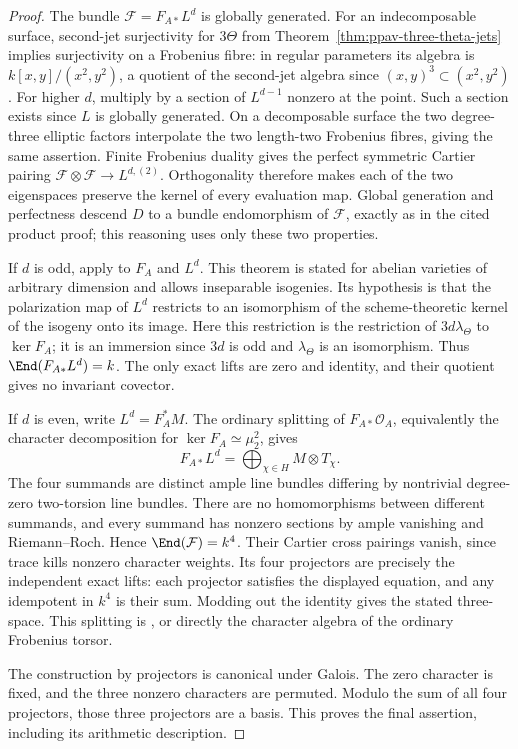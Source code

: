 \begin{proof}
The bundle $\mathcal F=F_{A*}L^d$ is globally generated. For an
indecomposable surface, second-jet surjectivity for $3\Theta$ from
Theorem~\ref{thm:ppav-three-theta-jets} implies surjectivity on a
Frobenius fibre: in regular parameters its algebra is
$k[x,y]/(x^2,y^2)$, a quotient of the second-jet algebra since
$(x,y)^3\subset(x^2,y^2)$. For higher $d$, multiply by a section of
$L^{d-1}$ nonzero at the point. Such a section exists since $L$ is globally
generated. On a decomposable surface the two degree-three elliptic factors
interpolate the two length-two Frobenius fibres, giving the same assertion.
Finite Frobenius duality gives the perfect symmetric Cartier pairing
$\mathcal F\otimes\mathcal F\to L^{d,(2)}$.
Orthogonality therefore makes each of the two eigenspaces preserve the
kernel of every evaluation map. Global generation and perfectness descend
$D$ to a bundle endomorphism of $\mathcal F$, exactly as in the cited
product proof; this reasoning uses only these two properties.

If $d$ is odd, apply \cite[Theorem~1.2(i), printed p.~45; proof
pp.~43--45]{Oda1971} to $F_A$ and $L^d$.
This theorem is stated for abelian varieties of arbitrary dimension and
allows inseparable isogenies. Its hypothesis is that the polarization map
of $L^d$ restricts to an isomorphism of the scheme-theoretic kernel of the
isogeny onto its image. Here this restriction is the restriction of
$3d\lambda_\Theta$ to $\ker F_A$; it is an immersion since $3d$ is odd
and $\lambda_\Theta$ is an isomorphism. Thus
$\End(F_{A*}L^d)=k$. The only exact lifts are zero and identity, and their
quotient gives no invariant covector.

If $d$ is even, write $L^d=F_A^*M$.
The ordinary splitting of $F_{A*}\mathcal O_A$, equivalently the character
decomposition for $\ker F_A\simeq\mu_2^2$, gives
\[
          F_{A*}L^d=\bigoplus_{\chi\in H}M\otimes T_\chi.
\]
The four summands are distinct ample line bundles differing by nontrivial
degree-zero two-torsion line bundles. There are no homomorphisms between
different summands, and every summand has nonzero sections by ample
vanishing and Riemann--Roch. Hence $\End(\mathcal F)=k^4$.
Their Cartier cross pairings vanish, since trace kills nonzero character
weights. Its four projectors are precisely the independent exact lifts:
each projector satisfies the displayed equation, and any idempotent in
$k^4$ is their sum. Modding out the identity gives the stated three-space.
This splitting is \cite[Lemma~4.5, p.~11]{SannaiTanaka2016}, or directly
the character algebra of the ordinary Frobenius torsor.

The construction by projectors is canonical under Galois. The zero
character is fixed, and the three nonzero characters are permuted.
Modulo the sum of all four projectors, those three projectors are a basis.
This proves the final assertion, including its arithmetic description.
\end{proof}

